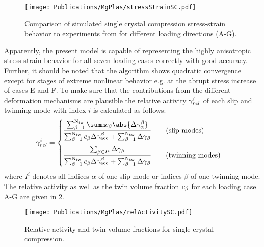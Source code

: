   \begin{figure}[!ht]
    \centering
    \texttt{[image: Publications/MgPlas/stressStrainSC.pdf]}
    \caption{Comparison of simulated single crystal compression stress-strain behavior to experiments from  for different loading directions (A-G).}
    \label{fig:StressStrainSC}
  \end{figure}
  Apparently, the present model is capable of representing the highly anisotropic stress-strain behavior for all seven loading cases correctly with good accuracy. Further, it should be noted that the algorithm shows quadratic convergence except for stages of extreme nonlinear behavior e.g. at the abrupt stress increase of cases E and F. To make sure that the contributions from the different deformation mechanisms are plausible the relative activity $\gamma_{rel}^{i}$ of each slip and twinning mode with index $i$ is calculated as follows:
  \begin{equation}
    \gammareli = 
    \begin{cases}
      \displaystyle \frac{\sumbNtw \summ \cb \abs{\Delta\gammaab}}{\sumbNtw \cb \Delta\gammaaccb + \sumbNtw \Delta\gammab} \qquad \text{(slip modes)}\\[15pt]
      \displaystyle \frac{\sum_{\beta \in I^i} \Delta\gammab}{\sumbNtw \cb \Delta\gammaaccb + \sumbNtw \Delta\gammab} \qquad \text{(twinning modes)}
    \end{cases}
  \end{equation}
  where $I^i$ denotes all indices $\alpha$ of one slip mode or indices $\beta$ of one twinning mode.  
  The relative activity as well as the twin volume fraction $c_{\beta}$ for each loading case A-G are given in \cref{fig:relAct}.
  
  \begin{figure}[ht!]
    \centering
    \texttt{[image: Publications/MgPlas/relActivitySC.pdf]}
    \caption{Relative activity and twin volume fractions for single crystal compression.}
    \label{fig:relAct}
  \end{figure}
  
